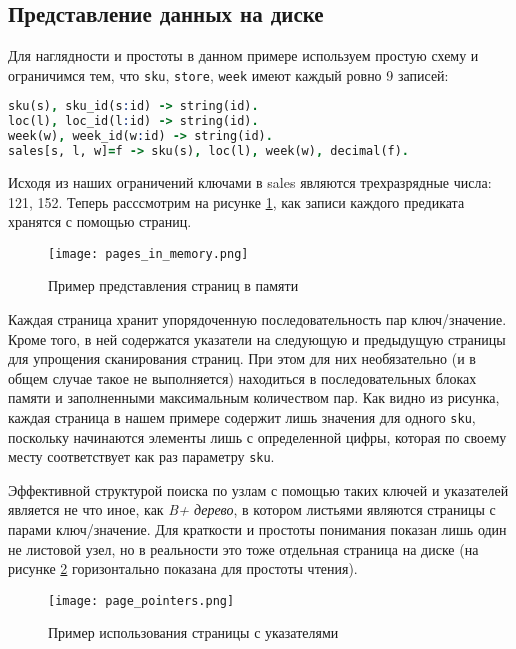 \subsection{Представление данных на диске}
\label{sec:optimization:data_repr}

Для наглядности и простоты в данном примере используем простую схему и ограничимся тем, что \lstinline{sku}, \lstinline{store}, \lstinline{week} имеют каждый ровно 9
записей:

\begin{lstlisting}[language=Prolog]
sku(s), sku_id(s:id) -> string(id).
loc(l), loc_id(l:id) -> string(id).
week(w), week_id(w:id) -> string(id).
sales[s, l, w]=f -> sku(s), loc(l), week(w), decimal(f).
\end{lstlisting}

Исходя из наших ограничений ключами в sales являются трехразрядные числа: 121, 152. Теперь расссмотрим на рисунке \ref{fig:optimization:data_repr:pages_in_memory}, как записи каждого предиката хранятся с помощью страниц.

\begin{figure}
	\centering
	\texttt{[image: pages\_in\_memory.png]}
	\caption{Пример представления страниц в памяти}
	\label{fig:optimization:data_repr:pages_in_memory}
\end{figure}

Каждая страница хранит упорядоченную последовательность пар ключ/значение. Кроме того, в ней содержатся указатели на следующую и предыдущую страницы для упрощения сканирования страниц. При этом для них необязательно (и в общем случае такое не выполняется) находиться в последовательных блоках памяти и заполненными максимальным количеством пар. Как видно из рисунка, каждая страница в нашем примере содержит лишь значения для одного \lstinline{sku}, поскольку начинаются элементы лишь с определенной цифры, которая по своему месту соответствует как раз параметру \lstinline{sku}.

Эффективной структурой поиска по узлам с помощью таких ключей и указателей является не что иное, как \emph{B+ дерево}, в котором листьями являются страницы с парами ключ/значение. Для краткости и простоты понимания показан лишь один не листовой узел, но в реальности это тоже отдельная страница на диске (на рисунке \ref{fig:optimization:data_repr:page_pointers} горизонтально показана для простоты чтения).

\begin{figure}
	\centering
	\texttt{[image: page\_pointers.png]}
	\caption{Пример использования страницы с указателями}
	\label{fig:optimization:data_repr:page_pointers}
\end{figure}


